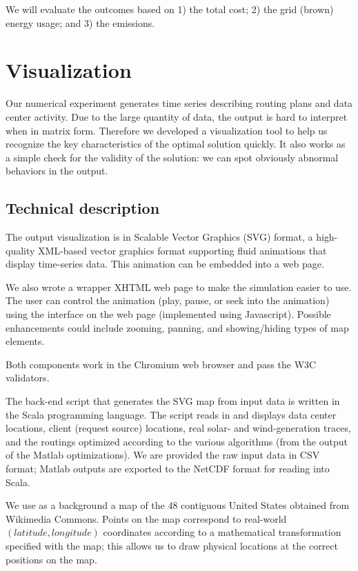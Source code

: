 \documentclass{acm_proc_article-sp}
\newcommand{\carbondioxide}{\ch{CO2}}
\begin{document}
We will evaluate the outcomes based on 1) the total cost; 2) the grid (brown) energy usage; and 3) the \carbondioxide{} emissions.

\section{Visualization}
Our numerical experiment generates time series describing routing plans and data center activity. Due to the large quantity of data, the output is hard to interpret when in matrix form. Therefore we developed a visualization tool to help us recognize the key characteristics of the optimal solution quickly. It also works as a simple check for the validity of the solution: we can spot obviously abnormal behaviors in the output.

\subsection{Technical description}
The output visualization is in Scalable Vector Graphics (SVG) format, a high-quality XML-based vector graphics format supporting fluid animations that display time-series data. This animation can be embedded into a web page.

We also wrote a wrapper XHTML web page to make the simulation easier to use. The user can control the animation (play, pause, or seek into the animation) using the interface on the web page (implemented using Javascript). Possible enhancements could include zooming, panning, and showing/hiding types of map elements.

Both components work in the Chromium web browser and pass the W3C validators.

The back-end script that generates the SVG map from input data is written in the Scala programming language. The script reads in and displays data center locations, client (request source) locations, real solar- and wind-generation traces, and the routings optimized according to the various algorithms (from the output of the Matlab optimizations). We are provided the raw input data in CSV format; Matlab outputs are exported to the NetCDF format for reading into Scala.

We use as a background a map \cite{wikimap} of the 48 contiguous United States obtained from Wikimedia Commons. Points on the map correspond to real-world $(latitude, longitude)$ coordinates according to a mathematical transformation specified with the map; this allows us to draw physical locations at the correct positions on the map.
\end{document}
